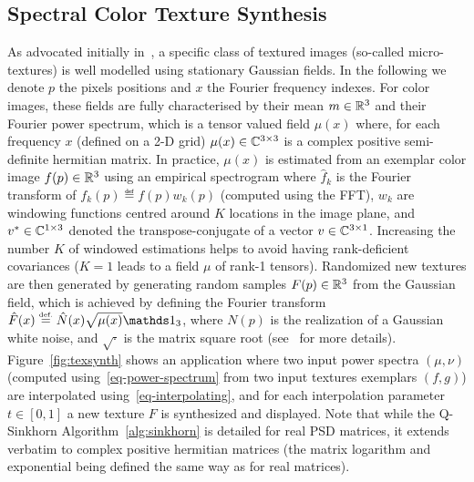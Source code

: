 

\subsection{Spectral Color Texture Synthesis}

As advocated initially in~\cite{galerne2011random}, a specific class of textured images (so-called micro-textures) is well modelled using stationary Gaussian fields. In the following we denote $p$ the pixels positions and $x$ the Fourier frequency indexes. For color images, these fields are fully characterised by their mean $m \in \mathbb{R}^3$ and their Fourier power spectrum, which is a tensor valued field $\mu(x)$ where, for each frequency $x$ (defined on a 2-D grid) $\mu(x) \in \mathbb{C}^{3 \times 3}$ is a complex positive semi-definite hermitian matrix. 
%
In practice, $\mu(x)$ is estimated from an exemplar color image $f(p) \in \mathbb{R}^3$ using an empirical spectrogram 
where $\hat f_k$ is the Fourier transform of $f_k(p) \eqdef f(p) w_k(p)$ (computed using the FFT), $w_k$ are windowing functions centred around $K$ locations in the image plane, and $v^* \in \mathbb{C}^{1 \times 3}$ denoted the transpose-conjugate of a vector $v \in \mathbb{C}^{3 \times 1}$. 
%
Increasing the number $K$ of windowed estimations helps to avoid having rank-deficient covariances ($K=1$ leads to a field $\mu$ of rank-1 tensors).
%
Randomized new textures are then generated by generating random samples $F(p) \in \mathbb{R}^3$ from the Gaussian field, which is achieved by defining the Fourier transform $\hat F(x) \eqdef \hat N(x) \sqrt{\mu(x)} \ones_3$, where $N(p)$ is the realization of a Gaussian white noise, and $\sqrt{\cdot}$ is the matrix square root (see~\cite{galerne2011random} for more details).
%
Figure~\ref{fig:texsynth} shows an application where two input power spectra $(\mu,\nu)$ (computed using~\eqref{eq-power-spectrum} from two input textures exemplars $(f,g)$)  are interpolated using~\eqref{eq-interpolating}, and for each interpolation parameter $t \in [0,1]$ a new texture $F$ is synthesized and displayed.
%
Note that while the Q-Sinkhorn Algorithm~\ref{alg:sinkhorn} is detailed for real PSD matrices, it extends verbatim to complex positive hermitian matrices (the matrix logarithm and exponential being defined the same way as for real matrices).


